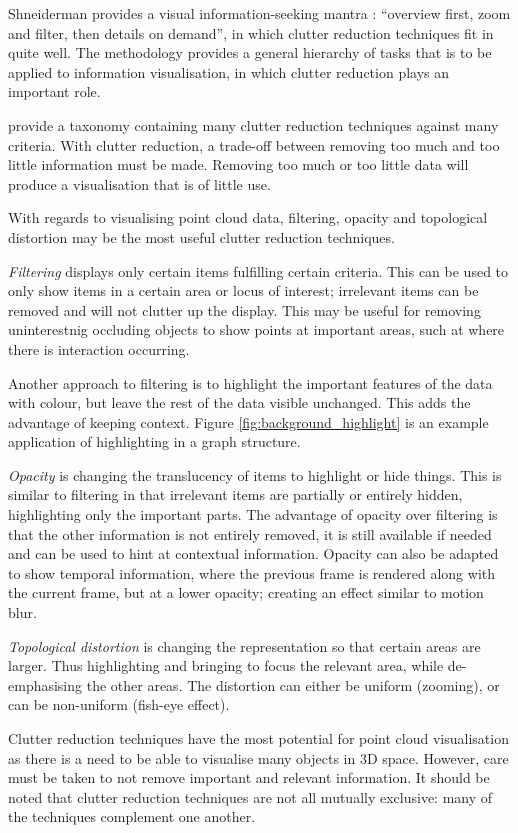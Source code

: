 Shneiderman provides a visual information-seeking mantra \citep{shneiderman96}:
``overview first, zoom and filter, then details on demand'', in which clutter
reduction techniques fit in quite well. The methodology provides a general hierarchy
of tasks that is to be applied to information visualisation, in which clutter
reduction plays an important role.

\citet{ellis07} provide a taxonomy containing many clutter reduction techniques
against many criteria. With clutter reduction, a trade-off between removing too
much and too little information must be made. Removing too much or too little
data will produce a visualisation that is of little use.

With regards to visualising point cloud data, filtering, opacity and topological
distortion may be the most useful clutter reduction techniques.

\emph{Filtering} displays only certain items fulfilling certain criteria. This can be
used to only show items in a certain area or locus of interest; irrelevant
items can be removed and will not clutter up the display. This may be useful
for removing uninterestnig occluding objects to show points at important areas,
such at where there is interaction occurring.

Another approach to filtering is to highlight the important features of the
data with colour, but leave the rest of the data visible unchanged. This adds
the advantage of keeping context. Figure \ref{fig:background_highlight} is an
example application of highlighting in a graph structure.

\emph{Opacity} is changing the translucency of items to highlight or hide
things. This is similar to filtering in that irrelevant items are partially or
entirely hidden, highlighting only the important parts. The advantage of
opacity over filtering is that the other information is not entirely removed,
it is still available if needed and can be used to hint at contextual
information. Opacity can also be adapted to show temporal information, where
the previous frame is rendered along with the current frame, but at a lower
opacity; creating an effect similar to motion blur.

\emph{Topological distortion} is changing the representation so that certain
areas are larger.  Thus highlighting and bringing to focus the relevant area,
while de-emphasising the other areas. The distortion can either be uniform
(zooming), or can be non-uniform (fish-eye effect).

Clutter reduction techniques have the most potential for point cloud
visualisation as there is a need to be able to visualise many objects in 3D
space. However, care must be taken to not remove important and relevant
information. It should be noted that clutter reduction techniques are not all
mutually exclusive: many of the techniques complement one another.

